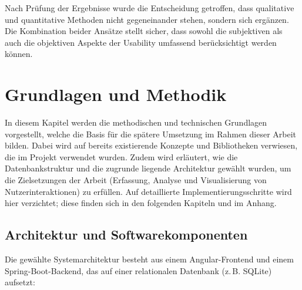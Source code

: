 \documentclass[12pt,oneside]{article}
\begin{document}
Nach Prüfung der Ergebnisse wurde die Entscheidung getroffen, dass qualitative und quantitative Methoden nicht gegeneinander stehen, sondern sich ergänzen. Die Kombination beider Ansätze stellt sicher, dass sowohl die subjektiven als auch die objektiven Aspekte der Usability umfassend berücksichtigt werden können.

\section{Grundlagen und Methodik}
In diesem Kapitel werden die methodischen und technischen Grundlagen vorgestellt, welche die Basis für die spätere Umsetzung im Rahmen dieser Arbeit bilden. Dabei wird auf bereits existierende Konzepte und Bibliotheken verwiesen, die im Projekt verwendet wurden. Zudem wird erläutert, wie die Datenbankstruktur und die zugrunde liegende Architektur gewählt wurden, um die Zielsetzungen der Arbeit (Erfassung, Analyse und Visualisierung von Nutzerinteraktionen) zu erfüllen. Auf detaillierte Implementierungsschritte wird hier verzichtet; diese finden sich in den folgenden Kapiteln und im Anhang.

\subsection{Architektur und Softwarekomponenten}

Die gewählte Systemarchitektur besteht aus einem Angular-Frontend und einem Spring-Boot-Backend, das auf einer relationalen Datenbank (z.\,B. SQLite) aufsetzt:
\end{document}
